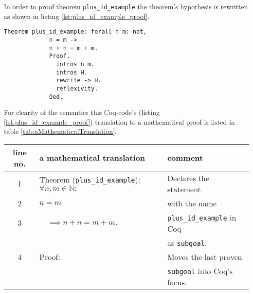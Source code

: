 	     In order to proof theorem \lstinline!plus_id_example! the theorem's hypothesis is rewritten as shown in listing \ref{lst:plus_id_example_proof}.
	     \begin{lstlisting}[caption = \lstinline!plus_id_example! and it's proof, label= {lst:plus_id_example_proof}]
           Theorem plus_id_example: forall n m: nat,
             n = m ->
             n + n = m + m.
             Proof.
               intros n m.
               intros H.
               rewrite -> H.
               reflexivity.
             Qed.
         \end{lstlisting} 
         For clearity of the semantics this Coq-code's (listing \ref{lst:plus_id_example_proof}) translation to a mathematical proof is listed in table \ref{tab:aMathematicalTranslation}.  
         \begin{table}[h]       
	   	  \begin{center}
	 	    \begin{tabular}{|c|l|l|}	       
	     	\hline
	     	 line no.  & a mathematical translation           & comment  \\  \hline
	     	  1        & Theorem (\verb!plus_id_example!): $\forall n,m \in \mathbb{N}:$ 
	     	                                                  & Declares the statement \\ 
	     	  2         & $n=m$                                & with the name   \\ 
	          3        & $\quad\implies n+n = m+m.$      & \lstinline!plus_id_example! in Coq \\  
		              &      & as \lstinline!subgoal!. \\  \hline
	     	  4        & Proof:                              & Moves the last proven \\   
	     	      	   &                                     & \lstinline!subgoal! into Coq's focus.  \\     \hline
	     	      	                      

\end{tabular}
\end{center}
\end{table}
